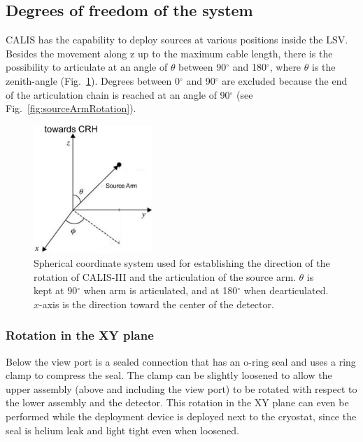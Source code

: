 \subsection{Degrees of freedom of the system}

CALIS has the capability to deploy sources at various positions inside the LSV. Besides the movement along z up to the maximum cable length, there is the possibility to articulate at an angle of $\theta$ between 90$^{\circ}$ and 180$^{\circ}$, where $\theta$ is the zenith-angle (Fig.~\ref{fig:coordinate_system}). Degrees between 0$^{\circ}$ and 90$^{\circ}$ are excluded because the end of the articulation chain is reached at an angle of 90$^{\circ}$ (see Fig.~\ref{fig:sourceArmRotation}).

\begin{figure}[htbp]
 \centering
  \includegraphics[width=0.4\textwidth]{Figures/coordinate_system}
  \caption{Spherical coordinate system used for establishing the direction of the rotation of CALIS-III and the articulation of the source arm. $\theta$ is kept at 90$^{\circ}$ when arm is articulated, and at 180$^{\circ}$ when dearticulated. $x$-axis is the direction toward the center of the detector. }
  \label{fig:coordinate_system}
\end{figure} 

\subsubsection{Rotation in the XY plane}\label{sec:XYrotation}
Below the view port is a sealed connection that has an o-ring seal and uses a ring clamp to compress the seal. The clamp can be slightly loosened to allow the upper assembly (above and including the view port) to be rotated with respect to the lower assembly and the detector. This rotation in the XY plane can even be performed while the deployment device is deployed next to the cryostat, since the seal is helium leak and light tight even when loosened.

